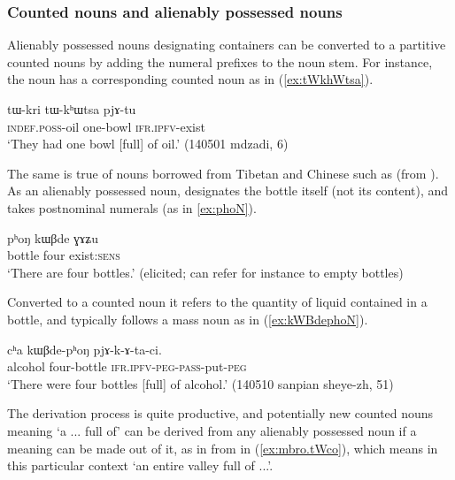 \subsubsection{Counted nouns and alienably possessed nouns}   \label{sec:CN.APN}
Alienably possessed nouns designating containers can be converted to a partitive counted nouns by adding the numeral prefixes to the noun stem. For instance, the noun  has a corresponding counted noun   as in (\ref{ex:tWkhWtsa}).

 \begin{exe}
\ex \label{ex:tWkhWtsa}
\gll tɯ-kri tɯ-kʰɯtsa pjɤ-tu \\
\textsc{indef}.\textsc{poss}-oil  one-bowl \textsc{ifr}.\textsc{ipfv}-exist \\
\glt `They had one bowl [full] of oil.' (140501 mdzadi, 6)
\end{exe}

The same is true of nouns borrowed from Tibetan and Chinese such as  (from ). As an alienably possessed noun,  designates the bottle itself (not its content), and takes postnominal numerals (as in \ref{ex:phoN}).

\begin{exe}
\ex \label{ex:phoN}
\gll  pʰoŋ kɯβde ɣɤʑu \\
bottle four exist:\textsc{sens} \\
\glt `There are four bottles.' (elicited; can refer for instance to empty bottles)
\end{exe}

Converted to a counted noun  it refers to the quantity of liquid contained in a bottle, and typically follows a mass noun as in (\ref{ex:kWBdephoN}).

\begin{exe}
\ex \label{ex:kWBdephoN}
\gll cʰa kɯβde-pʰoŋ pjɤ-k-ɤ-ta-ci. \\
alcohol four-bottle \textsc{ifr}.\textsc{ipfv}-\textsc{peg}-\textsc{pass}-put-\textsc{peg} \\
\glt  `There were four bottles [full] of alcohol.' (140510 sanpian sheye-zh, 51)
\end{exe}

The derivation process is quite productive, and potentially new counted nouns meaning `a ... full of' can be derived from any alienably possessed noun if a meaning can be made out of it, as in  from  in (\ref{ex:mbro.tWco}), which means in this particular context `an entire valley full of ...'.
 

